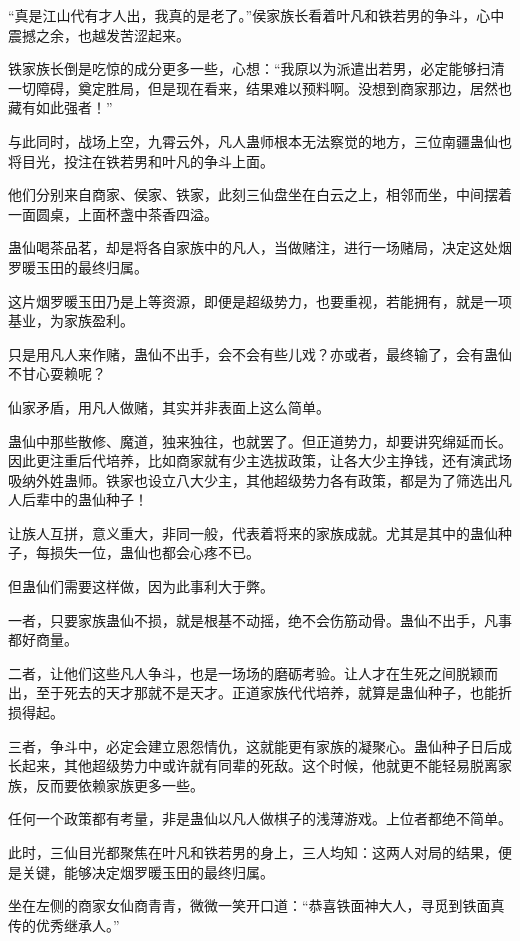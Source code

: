 \begin{this_body}
“真是江山代有才人出，我真的是老了。”侯家族长看着叶凡和铁若男的争斗，心中震撼之余，也越发苦涩起来。

铁家族长倒是吃惊的成分更多一些，心想：“我原以为派遣出若男，必定能够扫清一切障碍，奠定胜局，但是现在看来，结果难以预料啊。没想到商家那边，居然也藏有如此强者！”

与此同时，战场上空，九霄云外，凡人蛊师根本无法察觉的地方，三位南疆蛊仙也将目光，投注在铁若男和叶凡的争斗上面。

他们分别来自商家、侯家、铁家，此刻三仙盘坐在白云之上，相邻而坐，中间摆着一面圆桌，上面杯盏中茶香四溢。

蛊仙喝茶品茗，却是将各自家族中的凡人，当做赌注，进行一场赌局，决定这处烟罗暖玉田的最终归属。

这片烟罗暖玉田乃是上等资源，即便是超级势力，也要重视，若能拥有，就是一项基业，为家族盈利。

只是用凡人来作赌，蛊仙不出手，会不会有些儿戏？亦或者，最终输了，会有蛊仙不甘心耍赖呢？

仙家矛盾，用凡人做赌，其实并非表面上这么简单。

蛊仙中那些散修、魔道，独来独往，也就罢了。但正道势力，却要讲究绵延而长。因此更注重后代培养，比如商家就有少主选拔政策，让各大少主挣钱，还有演武场吸纳外姓蛊师。铁家也设立八大少主，其他超级势力各有政策，都是为了筛选出凡人后辈中的蛊仙种子！

让族人互拼，意义重大，非同一般，代表着将来的家族成就。尤其是其中的蛊仙种子，每损失一位，蛊仙也都会心疼不已。

但蛊仙们需要这样做，因为此事利大于弊。

一者，只要家族蛊仙不损，就是根基不动摇，绝不会伤筋动骨。蛊仙不出手，凡事都好商量。

二者，让他们这些凡人争斗，也是一场场的磨砺考验。让人才在生死之间脱颖而出，至于死去的天才那就不是天才。正道家族代代培养，就算是蛊仙种子，也能折损得起。

三者，争斗中，必定会建立恩怨情仇，这就能更有家族的凝聚心。蛊仙种子日后成长起来，其他超级势力中或许就有同辈的死敌。这个时候，他就更不能轻易脱离家族，反而要依赖家族更多一些。

任何一个政策都有考量，非是蛊仙以凡人做棋子的浅薄游戏。上位者都绝不简单。

此时，三仙目光都聚焦在叶凡和铁若男的身上，三人均知：这两人对局的结果，便是关键，能够决定烟罗暖玉田的最终归属。

坐在左侧的商家女仙商青青，微微一笑开口道：“恭喜铁面神大人，寻觅到铁面真传的优秀继承人。”


\end{this_body}
